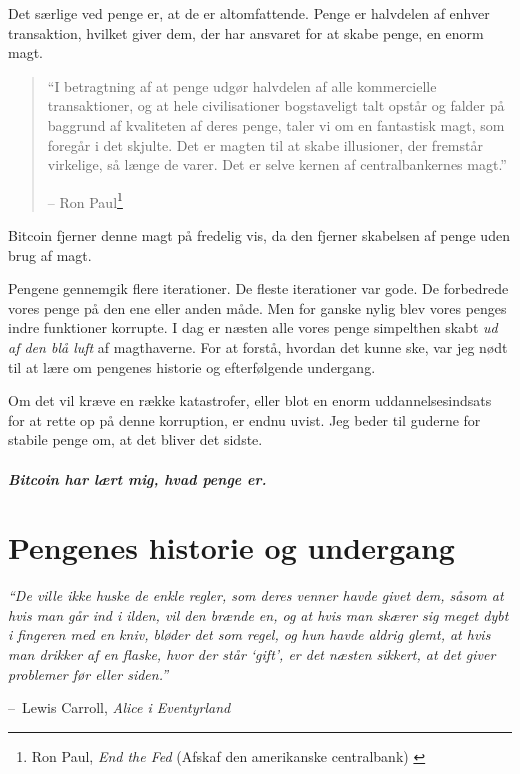 \documentclass[paper=6in:9in,pagesize=pdftex,headinclude=on,footinclude=on,12pt]{scrbook}
\makeatletter
\newenvironment{chapquote}[2][4em]{\setlength{\@tempdima}{#1}%
   \def\chapquote@author{#2}%
   \parshape 1 \@tempdima \dimexpr\textwidth-2\@tempdima\relax%
   \itshape}{\par\normalfont\hfill--\ \chapquote@author\hspace*{\@tempdima}\par\bigskip}
\makeatother
\begin{document}
Det særlige ved penge er, at de er altomfattende. Penge er halvdelen af enhver transaktion, hvilket giver dem, der har ansvaret for at skabe penge, en enorm magt.\begin{quotation}\begin{samepage} \enquote{I betragtning af at penge udgør halvdelen af alle kommercielle transaktioner, og at hele civilisationer bogstaveligt talt opstår og falder på baggrund af kvaliteten af deres penge, taler vi om en fantastisk magt, som foregår i det skjulte. Det er magten til at skabe illusioner, der fremstår virkelige, så længe de varer. Det er selve kernen af centralbankernes magt.} \begin{flushright} -- Ron Paul\footnote{Ron Paul, \textit{End the Fed} (Afskaf den amerikanske centralbank) \cite{end-the-fed}}
\end{flushright}\end{samepage}\end{quotation}

Bitcoin fjerner denne magt på fredelig vis, da den fjerner skabelsen af penge uden brug af magt.

Pengene gennemgik flere iterationer. De fleste iterationer var gode. De forbedrede vores penge på den ene eller anden måde. Men for ganske nylig blev vores penges indre funktioner korrupte. I dag er næsten alle vores penge simpelthen skabt \textit{ud af den blå luft} af magthaverne. For at forstå, hvordan det kunne ske, var jeg nødt til at lære om pengenes historie og efterfølgende undergang.

Om det vil kræve en række katastrofer, eller blot en enorm uddannelsesindsats for at rette op på denne korruption, er endnu uvist. Jeg beder til guderne for stabile penge om, at det bliver det sidste.\paragraph{Bitcoin har lært mig, hvad penge er.}%
%
%
%
%

\chapter{Pengenes historie og undergang}
\label{les:12}

\begin{chapquote}{Lewis Carroll, \textit{Alice i Eventyrland}} \enquote{De ville ikke huske de enkle regler, som deres venner havde givet dem, såsom at hvis man går ind i ilden, vil den brænde en, og at hvis man skærer sig meget dybt i fingeren med en kniv, bløder det som regel, og hun havde aldrig glemt, at hvis man drikker af en flaske, hvor der står \enquote{gift}, er det næsten sikkert, at det giver problemer før eller siden.} \end{chapquote}
\end{document}
